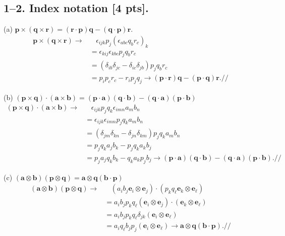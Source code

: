 \subsection*{1--2. \textbf{Index notation} [4 pts].} 

\medskip
(a) $\bm{p} \times (\bm{q} \times \bm{r}) = (\bm{r} \cdot \bm{p}) \bm{q} - (\bm{q} \cdot \bm{p}) \bm{r}$.
\begin{align*}
    \bm{p} \times (\bm{q} \times \bm{r}) \rightarrow& ~~~~\epsilon_{ijk} p_j (\epsilon_{abc} q_b r_c )_k\\
    & =\epsilon_{kij} \epsilon_{kbc} p_j q_b r_c\\
    &=(\delta_{ib} \delta_{jc} - \delta_{ic}\delta_{jb} ) p_j q_b r_c\\
    &=p_i p_c r_c - r_i p_j q_j \rightarrow (\bm{p} \cdot \bm{r})\bm{q} - (\bm{p} \cdot \bm{q}) \bm{r}.//
\end{align*}

\medskip
(b) $(\bm{p} \times \bm{q}) \cdot (\bm{a} \times \bm{b}) = (\bm{p} \cdot \bm{a}) (\bm{q} \cdot \bm{b}) - (\bm{q} \cdot \bm{a})(\bm{p} \cdot \bm{b})$
\begin{align*}
    (\bm{p} \times \bm{q}) \cdot (\bm{a} \times \bm{b}) \rightarrow & ~~~~\epsilon_{ijk} p_j q_k \epsilon_{imn} a_m b_n\\
    & =\epsilon_{ijk} \epsilon_{imn} p_j q_k a_m b_n\\
    &=(\delta_{jm}\delta_{kn}-\delta_{jn}\delta_{km}) p_j q_k a_m b_n\\
    &= p_j q_k a_j b_k - p_j q_k a_k b_j\\
    &= p_j a_j q_k b_k - q_k a_k p_j b_j \rightarrow (\bm{p} \cdot \bm{a}) (\bm{q} \cdot \bm{b}) - (\bm{q} \cdot \bm{a})(\bm{p} \cdot \bm{b}).//
\end{align*}

\medskip
(c) $(\bm{a} \otimes \bm{b})(\bm{p} \otimes \bm{q}) = \bm{a}\otimes\bm{q}(\bm{b} \cdot \bm{p}) $
\begin{align*}
   (\bm{a} \otimes \bm{b})(\bm{p} \otimes \bm{q}) \rightarrow & ~~~~(a_i b_j \bm{e}_i \otimes \bm{e}_j) \cdot (p_k q_\ell \bm{e}_k \otimes \bm{e}_\ell) \\
    & = a_i b_j p_k q_\ell (\bm{e}_i \otimes \bm{e}_j) \cdot (\bm{e}_k \otimes \bm{e}_\ell)\\
    &= a_i b_j p_k q_\ell \delta_{jk} (\bm{e}_i \otimes \bm{e}_{\ell})\\
    &= a_i q_\ell  b_j p_j (\bm{e}_i \otimes \bm{e}_{\ell}) \rightarrow \bm{a}\otimes\bm{q}(\bm{b} \cdot \bm{p}).//
\end{align*}

